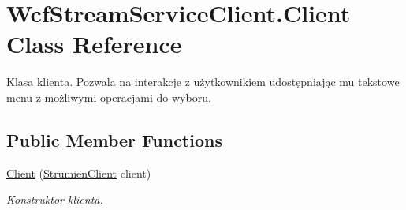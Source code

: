 \hypertarget{class_wcf_stream_service_client_1_1_client}{}\section{Wcf\+Stream\+Service\+Client.\+Client Class Reference}
\label{class_wcf_stream_service_client_1_1_client}


Klasa klienta. Pozwala na interakcje z użytkownikiem udostępniając mu tekstowe menu z możliwymi operacjami do wyboru.  


\subsection*{Public Member Functions}
\begin{DoxyCompactItemize}
\item 
\hyperlink{class_wcf_stream_service_client_1_1_client_a04a60e2a76ab51077d00c0219e4ffc3e}{Client} (\hyperlink{class_wcf_stream_service_client_1_1_service_reference1_1_1_strumien_client}{Strumien\+Client} client)
\begin{DoxyCompactList}\small\item\em Konstruktor klienta. \end{DoxyCompactList}\end{DoxyCompactItemize}
